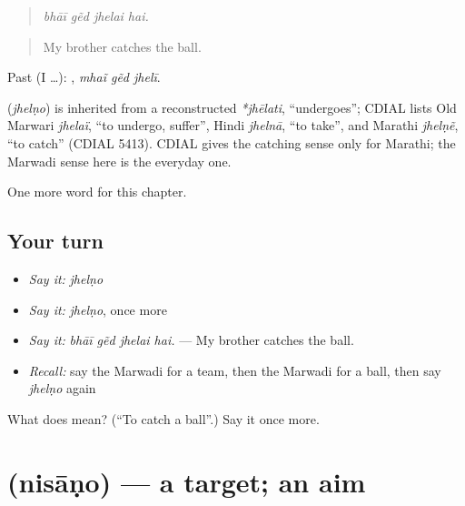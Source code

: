 \begin{quote}
   
\end{quote}

\begin{quote}
\emph{bhāī gẽd jhelai hai.}
\end{quote}

\begin{quote}
My brother catches the ball.
\end{quote}

Past (I …):   , \emph{mhaĩ gẽd jhelī}.

\begin{cousinweb}
\textbf{} (\emph{jhelṇo}) is inherited from a reconstructed \emph{*jhēlati}, \textquotedblleft{}undergoes\textquotedblright{}; CDIAL lists Old Marwari \emph{jhelaï}, \textquotedblleft{}to undergo, suffer\textquotedblright{}, Hindi \emph{jhelnā}, \textquotedblleft{}to take\textquotedblright{}, and Marathi \emph{jhelṇẽ}, \textquotedblleft{}to catch\textquotedblright{} (CDIAL 5413). CDIAL gives the catching sense only for Marathi; the Marwadi sense here is the everyday one.
\end{cousinweb}

\begin{grammarlens}[title={What you've built}]
One more word for this chapter.
\end{grammarlens}

\subsection*{Your turn}
\begin{itemize}
\raggedright
  \item \emph{Say it:} \emph{jhelṇo}
  \item \emph{Say it:} \emph{jhelṇo}, once more
  \item \emph{Say it:} \emph{bhāī gẽd jhelai hai.} — My brother catches the ball.
  \item \emph{Recall:} say the Marwadi for a team, then the Marwadi for a ball, then say \emph{jhelṇo} again
\end{itemize}

\begin{tcolorbox}[breakable,colback=teal!4,colframe=teal!35!black,title={Before you move on}]
What does  mean? (\textquotedblleft{}To catch a ball\textquotedblright{}.) Say it once more.
\end{tcolorbox}
\section[\texorpdfstring{\mw{निसाणो} (nisāṇo)}{निसाणो (nisāṇo)}]{ (nisāṇo) — a target; an aim}

